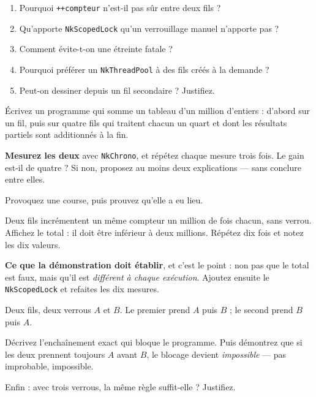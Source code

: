 \begin{nkquestions}
\begin{enumerate}
\item Pourquoi \texttt{++compteur} n'est-il pas sûr entre deux fils ?
\item Qu'apporte \texttt{NkScopedLock} qu'un verrouillage manuel n'apporte pas ?
\item Comment évite-t-on une étreinte fatale ?
\item Pourquoi préférer un \texttt{NkThreadPool} à des fils créés à la demande ?
\item Peut-on dessiner depuis un fil secondaire ? Justifiez.
\end{enumerate}
\end{nkquestions}

\begin{nkpratique}
Écrivez un programme qui somme un tableau d'un million d'entiers : d'abord sur un
fil, puis sur quatre fils qui traitent chacun un quart et dont les résultats
partiels sont additionnés à la fin.

\textbf{Mesurez les deux} avec \texttt{NkChrono}, et répétez chaque mesure trois
fois. Le gain est-il de quatre ? Si non, proposez au moins deux explications
--- sans conclure entre elles.
\end{nkpratique}

\begin{nkdemo}
Provoquez une course, puis prouvez qu'elle a eu lieu.

Deux fils incrémentent un même compteur un million de fois chacun, sans verrou.
Affichez le total : il doit être inférieur à deux millions. Répétez dix fois et
notez les dix valeurs.

\textbf{Ce que la démonstration doit établir}, et c'est le point : non pas que le
total est faux, mais qu'il est \emph{différent à chaque exécution}. Ajoutez
ensuite le \texttt{NkScopedLock} et refaites les dix mesures.
\end{nkdemo}

\begin{nklogique}
Deux fils, deux verrous $A$ et $B$. Le premier prend $A$ puis $B$ ; le second
prend $B$ puis $A$.

Décrivez l'enchaînement exact qui bloque le programme. Puis démontrez que si les
deux prennent toujours $A$ avant $B$, le blocage devient \emph{impossible} ---
pas improbable, impossible.

Enfin : avec trois verrous, la même règle suffit-elle ? Justifiez.
\end{nklogique}
